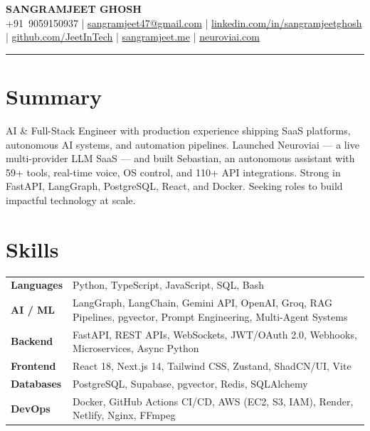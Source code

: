 \documentclass[9.5pt]{article}
\begin{document}
\begin{center}
  {\large \textbf{SANGRAMJEET GHOSH}} \\[2pt]
  {\small
    +91~9059150937 \;|\;
    \href{mailto:sangramjeet47@gmail.com}{sangramjeet47@gmail.com} \;|\;
    \href{https://www.linkedin.com/in/sangramjeetghosh}{linkedin.com/in/sangramjeetghosh} \;|\;
    \href{https://github.com/JeetInTech}{github.com/JeetInTech} \;|\;
    \href{https://sangramjeet.me}{sangramjeet.me} \;|\;
    \href{https://neuroviai.com}{neuroviai.com}
  }
\end{center}

\vspace{-2pt}
\noindent\rule{\textwidth}{0.4pt}
\vspace{-4pt}

\section*{Summary}
AI \& Full-Stack Engineer with production experience shipping SaaS platforms, autonomous AI systems, and automation pipelines. Launched Neuroviai — a live multi-provider LLM SaaS — and built Sebastian, an autonomous assistant with 59+ tools, real-time voice, OS control, and 110+ API integrations. Strong in FastAPI, LangGraph, PostgreSQL, React, and Docker. Seeking roles to build impactful technology at scale.

\section*{Skills}
\begin{tabularx}{\textwidth}{@{} p{1.9cm} X @{}}
\textbf{Languages}  & Python, TypeScript, JavaScript, SQL, Bash \\[1pt]
\textbf{AI / ML}    & LangGraph, LangChain, Gemini API, OpenAI, Groq, RAG Pipelines, pgvector, Prompt Engineering, Multi-Agent Systems \\[1pt]
\textbf{Backend}    & FastAPI, REST APIs, WebSockets, JWT/OAuth 2.0, Webhooks, Microservices, Async Python \\[1pt]
\textbf{Frontend}   & React 18, Next.js 14, Tailwind CSS, Zustand, ShadCN/UI, Vite \\[1pt]
\textbf{Databases}  & PostgreSQL, Supabase, pgvector, Redis, SQLAlchemy \\[1pt]
\textbf{DevOps}     & Docker, GitHub Actions CI/CD, AWS (EC2, S3, IAM), Render, Netlify, Nginx, FFmpeg \\
\end{tabularx}
\end{document}
